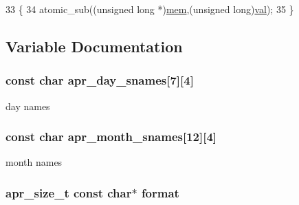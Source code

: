 \begin{DoxyCode}
33 \{
34     atomic\_sub((\textcolor{keywordtype}{unsigned} \textcolor{keywordtype}{long} *)\hyperlink{group__MOD__DAV_gac8d0feaae3f1c6b0eac72aaa9af557c1}{mem},(\textcolor{keywordtype}{unsigned} \textcolor{keywordtype}{long})\hyperlink{group__APACHE__CORE__CONFIG_gae553dcb033cb5c1e269683855e4f676a}{val});
35 \}
\end{DoxyCode}


\subsection{Variable Documentation}
\subsubsection[{\texorpdfstring{apr\+\_\+day\+\_\+snames}{apr_day_snames}}]{ const char apr\+\_\+day\+\_\+snames\mbox{[}7\mbox{]}\mbox{[}4\mbox{]}}\hypertarget{group__apr__time_ga7deb42a36f677bf27da84151f7df74dc}{}\label{group__apr__time_ga7deb42a36f677bf27da84151f7df74dc}
day names 
\subsubsection[{\texorpdfstring{apr\+\_\+month\+\_\+snames}{apr_month_snames}}]{ const char apr\+\_\+month\+\_\+snames\mbox{[}12\mbox{]}\mbox{[}4\mbox{]}}\hypertarget{group__apr__time_ga4307e6d6e3a6e60af902edc4743723ee}{}\label{group__apr__time_ga4307e6d6e3a6e60af902edc4743723ee}
month names 
\subsubsection[{\texorpdfstring{format}{format}}]{ {\bf apr\+\_\+size\+\_\+t} const char$\ast$ format}\hypertarget{group__apr__time_ga6427c3237144d9709aa13825289f0b78}{}\label{group__apr__time_ga6427c3237144d9709aa13825289f0b78}

